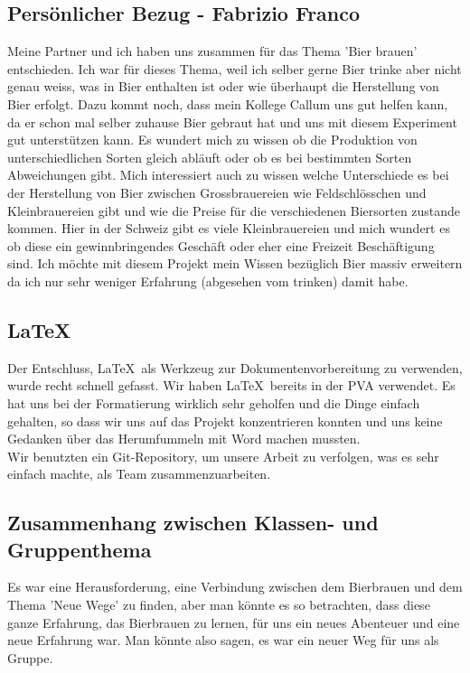 \subsection{Persönlicher Bezug - Fabrizio Franco}
 Meine Partner und ich haben uns zusammen für das Thema 'Bier brauen' entschieden. Ich war für dieses Thema, weil ich selber
  gerne Bier trinke aber nicht genau weiss, was in Bier enthalten ist oder wie überhaupt die Herstellung von Bier erfolgt. 
  Dazu kommt noch, dass mein Kollege Callum uns gut helfen kann, da er schon mal selber zuhause Bier gebraut hat und uns mit diesem 
  Experiment gut unterstützen kann. Es wundert mich zu wissen ob die Produktion von unterschiedlichen Sorten gleich abläuft oder 
  ob es bei bestimmten Sorten Abweichungen gibt. Mich interessiert auch zu wissen welche Unterschiede es bei der Herstellung von Bier
   zwischen Grossbrauereien wie Feldschlösschen und Kleinbrauereien gibt und wie die Preise für die verschiedenen Biersorten zustande 
   kommen. Hier in der Schweiz gibt es viele Kleinbrauereien und mich wundert es ob diese ein gewinnbringendes Geschäft oder eher eine
    Freizeit Beschäftigung sind. 
 Ich möchte mit diesem Projekt mein Wissen bezüglich Bier massiv erweitern da ich nur sehr weniger Erfahrung (abgesehen vom trinken) damit habe.
\subsection{\LaTeX\ }
Der Entschluss, \LaTeX\  als Werkzeug zur Dokumentenvorbereitung zu verwenden, wurde recht schnell gefasst. Wir haben \LaTeX\  bereits in
 der PVA verwendet. Es hat uns bei der Formatierung wirklich sehr geholfen und die Dinge einfach gehalten,
 so dass wir uns auf das Projekt konzentrieren konnten und uns keine Gedanken über das Herumfummeln mit Word machen mussten.
\\
Wir benutzten ein Git-Repository, um unsere Arbeit zu verfolgen, was es sehr einfach machte, als Team zusammenzuarbeiten. 
\subsection{Zusammenhang zwischen Klassen- und Gruppenthema}
Es war eine Herausforderung, eine Verbindung zwischen dem Bierbrauen und dem Thema 'Neue Wege' zu finden, aber man könnte es so betrachten, dass diese ganze Erfahrung, das Bierbrauen zu lernen, für uns ein neues Abenteuer und eine neue Erfahrung war. Man könnte also sagen, es war ein neuer Weg für uns als Gruppe.
\newpage
